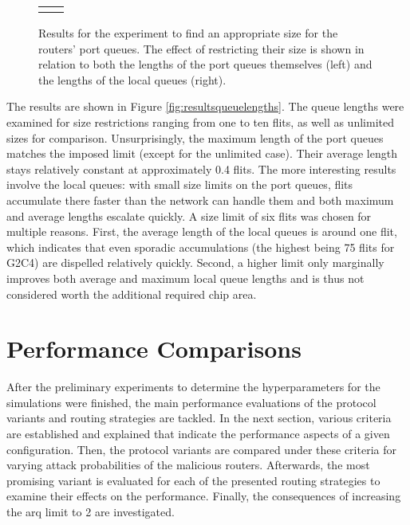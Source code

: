 \begin{figure}
    \centering
    \begin{tabular}{cc}
         & 
    \end{tabular}
    \caption[Results for the port queue sizes experiment]{Results for the experiment to find an appropriate size for the routers' port queues. The
    effect of restricting their size is shown in relation to both the lengths of the port queues themselves (left) and the lengths of the local queues
    (right).}
    \label{fig:resultsqueuelengths}
\end{figure}

The results are shown in Figure \vref{fig:resultsqueuelengths}. The queue lengths were examined for size restrictions ranging from one to ten flits,
as well as unlimited sizes for comparison. Unsurprisingly, the maximum length of the port queues matches the imposed limit (except for the unlimited
case). Their average length stays relatively constant at approximately 0.4 flits. The more interesting results involve the local queues: with small
size limits on the port queues, flits accumulate there faster than the network can handle them and both maximum and average lengths escalate quickly.
A size limit of six flits was chosen for multiple reasons. First, the average length of the local queues is around one flit, which indicates that even
sporadic accumulations (the highest being 75 flits for G2C4) are dispelled relatively quickly. Second, a higher limit only marginally improves both
average and maximum local queue lengths and is thus not considered worth the additional required chip area.

\section{Performance Comparisons}\label{sec:perfcompeval}
After the preliminary experiments to determine the hyperparameters for the simulations were finished, the main performance evaluations of the protocol
variants and routing strategies are tackled. In the next section, various criteria are established and explained that indicate the performance aspects
of a given configuration. Then, the protocol variants are compared under these criteria for varying attack probabilities of the malicious routers.
Afterwards, the most promising variant is evaluated for each of the presented routing strategies to examine their effects on the performance. Finally,
the consequences of increasing the \gls{arq} limit to 2 are investigated.

